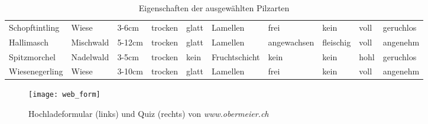 \begin{sidewaystable}[h]
\begin{center}
\begin{tabular}{l | l | l | l | l | l | l | l | l | l}
			Schopftintling            & Wiese                & 3-6cm                   & trocken                & glatt            & Lamellen              & frei                     & kein              & voll           & geruchlos       \\
			Hallimasch                & Mischwald            & 5-12cm                  & trocken                & glatt            & Lamellen              & angewachsen              & fleischig         & voll           & angenehm        \\
			Spitzmorchel              & Nadelwald            & 3-5cm                   & trocken                & kein             & Fruchtschicht         & kein                     & kein              & hohl           & geruchlos       \\
			Wiesenegerling            & Wiese                & 3-10cm                  & trocken                & glatt            & Lamellen              & frei                     & kein              & voll           & angenehm
		\end{tabular}
	\end{center}
	\caption{Eigenschaften der ausgewählten Pilzarten}
	\label{table:shrooms_einf}
\end{sidewaystable}

\begin{figure}[h]
	\centering
	\texttt{[image: web\_form]}
	\caption[Hochladeformular \& Quiz]{Hochladeformular (links) und Quiz (rechts) von \textit{www.obermeier.ch}}
	\label{img:webpage}
\end{figure}

